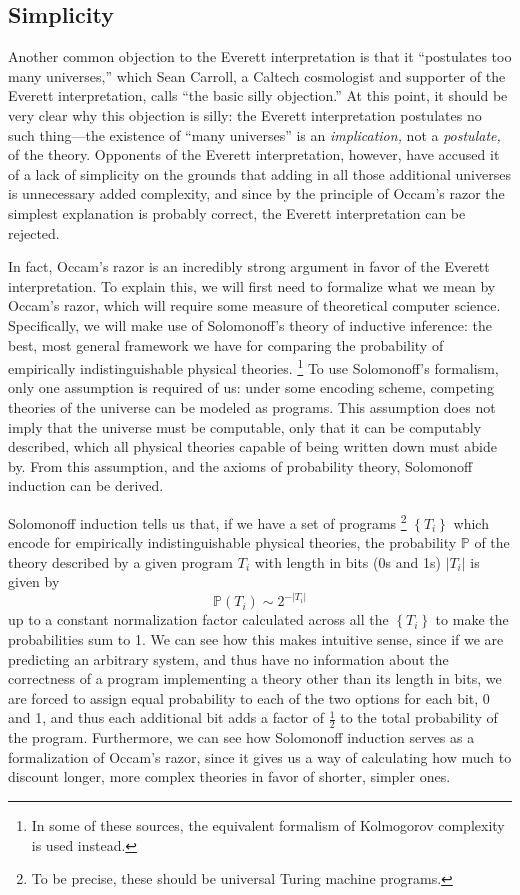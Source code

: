 \documentclass[
    12pt,
    letterpaper,
    aps,
    prd,
    longbibliography,
    twocolumn,
    nofootinbib,
    raggedbottom,
    amsmath,
    amssymb,
    amsfonts,
]{revtex4-1}
\newcommand{\abs}[1]{\left|#1\right|}
\newcommand{\set}[1]{\left\{#1\right\}}
\newcommand{\mbb}[1]{\mathbb{#1}}
\let\origfootnote\footnote
\renewcommand{\footnote}[1]{%
   \begingroup%
   \renewcommand{\footnotesize}{\fontsize{10pt}{8pt}\selectfont}%
   \origfootnote{#1}%
   \endgroup%
}
\begin{document}
\subsection{Simplicity}
\label{sec:simp}

Another common objection to the Everett interpretation is that it ``postulates too many universes,'' which Sean Carroll, a Caltech cosmologist and supporter of the Everett interpretation, calls ``the basic silly objection.''\cite{carroll} At this point, it should be very clear why this objection is silly: the Everett interpretation postulates no such thing---the existence of ``many universes'' is an \textit{implication,} not a \textit{postulate,} of the theory. Opponents of the Everett interpretation, however, have accused it of a lack of simplicity on the grounds that adding in all those additional universes is unnecessary added complexity, and since by the principle of Occam's razor the simplest explanation is probably correct, the Everett interpretation can be rejected.\cite{badoccam}

In fact, Occam's razor is an incredibly strong argument in favor of the Everett interpretation. To explain this, we will first need to formalize what we mean by Occam's razor, which will require some measure of theoretical computer science. Specifically, we will make use of Solomonoff's theory of inductive inference: the best, most general framework we have for comparing the probability of empirically indistinguishable physical theories.\cite{solomonoff}\cite{occam}\cite{lesswrongsolomonoff}\footnote{In some of these sources, the equivalent formalism of Kolmogorov complexity is used instead.} To use Solomonoff's formalism, only one assumption is required of us: under some encoding scheme, competing theories of the universe can be modeled as programs. This assumption does not imply that the universe must be computable, only that it can be computably described, which all physical theories capable of being written down must abide by. From this assumption, and the axioms of probability theory, Solomonoff induction can be derived.\cite{solomonoff}

Solomonoff induction tells us that, if we have a set of programs\footnote{To be precise, these should be universal Turing machine programs.} $\set{T_i}$ which encode for empirically indistinguishable physical theories, the probability $\mbb P$ of the theory described by a given program $T_i$ with length in bits (0s and 1s) $\abs{T_i}$ is given by
\[
    \mbb P(T_i) \sim 2^{-\abs{T_i}}
\]
up to a constant normalization factor calculated across all the $\set{T_i}$ to make the probabilities sum to 1.\cite{solomonoff} We can see how this makes intuitive sense, since if we are predicting an arbitrary system, and thus have no information about the correctness of a program implementing a theory other than its length in bits, we are forced to assign equal probability to each of the two options for each bit, 0 and 1, and thus each additional bit adds a factor of $\frac{1}{2}$ to the total probability of the program. Furthermore, we can see how Solomonoff induction serves as a formalization of Occam's razor, since it gives us a way of calculating how much to discount longer, more complex theories in favor of shorter, simpler ones.
\end{document}
